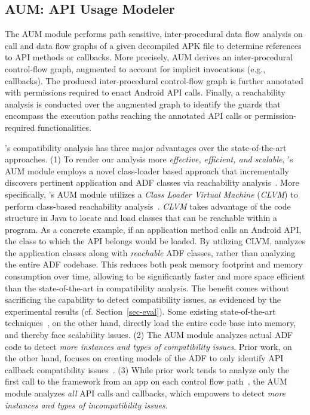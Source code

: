 \subsection{AUM: API Usage Modeler}
\label{API Usage Extraction}

The AUM module performs path sensitive, inter-procedural
data flow analysis on call and data flow graphs of a given
decompiled APK file to determine references to API methods
or callbacks.  More precisely, AUM derives an
inter-procedural control-flow graph, augmented to account
for implicit invocations (e.g., callbacks). The produced inter-procedural
control-flow graph is further annotated with permissions
required to enact Android API calls. Finally, a reachability
analysis is conducted over the augmented graph to identify
the guards that encompass the execution paths reaching the
annotated API calls or permission-required functionalities. 

\@approach's compatibility analysis has three major
advantages over the state-of-the-art approaches.
(1) To render our analysis more \emph{effective,
efficient, and scalable}, \@approach's AUM module
employs a novel class-loader based approach that incrementally discovers
pertinent application and ADF classes via reachability
analysis~\cite{tsutano2017efficient}.  
More specifically, \@approach's AUM module utilizes a \emph{Class Loader
Virtual Machine} (\emph{CLVM}) to perform class-based
reachability analysis~\cite{tsutano2017efficient}.
\emph{CLVM} takes advantage of the code structure in Java
to locate and load classes that can be reachable within
a program.  As a concrete example, if an application method
calls an Android API, the class to which the API
belongs would be loaded.  By utilizing CLVM, \@approach analyzes the application classes along with \emph{reachable} ADF classes, rather than analyzing the entire ADF codebase. 
This reduces both peak memory footprint and memory consumption over time, allowing \@approach
to be significantly faster and more space efficient
than the state-of-the-art in compatibility analysis.
The benefit comes without sacrificing the capability to detect
compatibility issues, as evidenced by the experimental
results (cf.  Section~\ref{sec-eval}).  
Some existing
state-of-the-art
techniques~\cite{huang2018understanding,he2018understanding},
on the other hand, directly load the entire code base
into memory, and thereby face scalability issues. 
(2) The AUM module analyzes actual ADF code to detect
\emph{more instances and types of compatibility issues}.
Prior work, on the other hand, focuses on creating models of
the ADF to only identify API callback compatibility
issues~\cite{huang2018understanding}.  
(3) While prior
work tends to analyze only the first call to the framework from an
app on each control flow path~\cite{lili2018cid}, the AUM module analyzes \emph{all} API calls and callbacks, which empowers
\@approach to detect \emph{more instances and types of
incompatibility issues}. 

